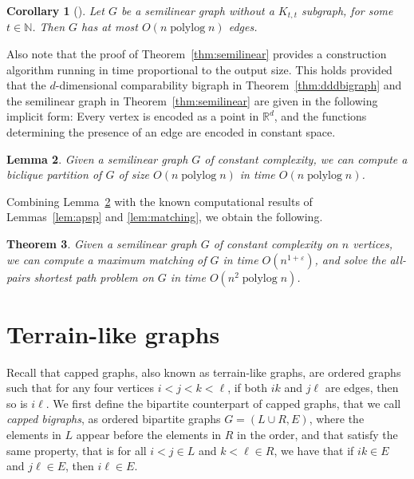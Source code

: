 \documentclass{amsart}
\newtheorem{theorem}{Theorem}%
\newtheorem{corollary}[theorem]{Corollary}
\newtheorem{lemma}[theorem]{Lemma}
\newcommand{\darkblue}{\color{darkblue}} %
\newcommand{\defn}[1]{\textsl{\darkblue #1}} %
\DeclareMathOperator{\polylog}{\mathrm{polylog}}
\begin{document}
\begin{corollary}[\cite{BCSTT21}]
    Let $G$ be a semilinear graph without a $K_{t,t}$ subgraph, for some $t\in\mathbb{N}$. Then $G$ has at most $O(n\polylog n)$ edges.
\end{corollary}

Also note that the proof of Theorem~\ref{thm:semilinear} provides a construction algorithm running in time proportional to the output size.
This holds provided that the $d$-dimensional comparability bigraph in Theorem~\ref{thm:dddbigraph} and the semilinear graph in Theorem~\ref{thm:semilinear} are given in the following implicit form: Every vertex is encoded as a point in $\mathbb{R}^d$, and the functions determining the presence of an edge are encoded in constant space.

\begin{lemma}
\label{lem:compsemilinear}
    Given a semilinear graph $G$ of constant complexity, we can compute a biclique partition of $G$ of size $O(n\polylog n)$ in time $O(n\polylog n)$.
\end{lemma}

Combining Lemma~\ref{lem:compsemilinear} with the known computational results of Lemmas~\ref{lem:apsp} and \ref{lem:matching}, we obtain the following.

\begin{theorem}
    Given a semilinear graph $G$ of constant complexity on $n$ vertices, we can compute a maximum matching of $G$ in time $O(n^{1+\varepsilon})$, and solve the all-pairs shortest path problem on $G$ in time $O(n^2\polylog n)$.
\end{theorem}

\section{Terrain-like graphs}
\label{sec:terrain}

Recall that capped graphs, also known as terrain-like graphs, are ordered graphs such that for any four vertices $i<j<k<\ell$, if both $ik$ and $j\ell$ are edges, then so is $i\ell$.
We first define the bipartite counterpart of capped graphs, that we call \defn{capped bigraphs}, as ordered bipartite graphs $G=(L\cup R, E)$, where the elements in $L$ appear before the elements in $R$ in the order, and that satisfy the same property, that is for all $i<j\in L$ and $k<\ell\in R$, we have that if $ik\in E$ and $j\ell\in E$, then $i\ell\in E$.
\end{document}
